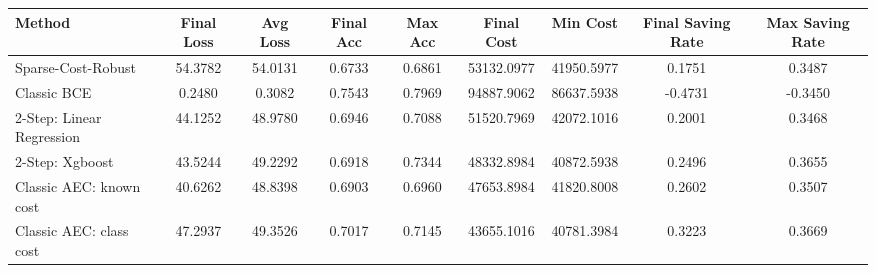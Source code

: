 \begin{tabular}{lcccccccc}
\toprule
Method & Final Loss & Avg Loss & Final Acc & Max Acc & Final Cost & Min Cost & Final Saving Rate & Max Saving Rate \\
\midrule
Sparse-Cost-Robust & 54.3782 & 54.0131 & 0.6733 & 0.6861 & 53132.0977 & 41950.5977 & 0.1751 & 0.3487 \\
Classic BCE & 0.2480 & 0.3082 & 0.7543 & 0.7969 & 94887.9062 & 86637.5938 & -0.4731 & -0.3450 \\
2-Step: Linear Regression & 44.1252 & 48.9780 & 0.6946 & 0.7088 & 51520.7969 & 42072.1016 & 0.2001 & 0.3468 \\
2-Step: Xgboost & 43.5244 & 49.2292 & 0.6918 & 0.7344 & 48332.8984 & 40872.5938 & 0.2496 & 0.3655 \\
Classic AEC: known cost & 40.6262 & 48.8398 & 0.6903 & 0.6960 & 47653.8984 & 41820.8008 & 0.2602 & 0.3507 \\
Classic AEC: class cost & 47.2937 & 49.3526 & 0.7017 & 0.7145 & 43655.1016 & 40781.3984 & 0.3223 & 0.3669 \\
\bottomrule
\end{tabular}
